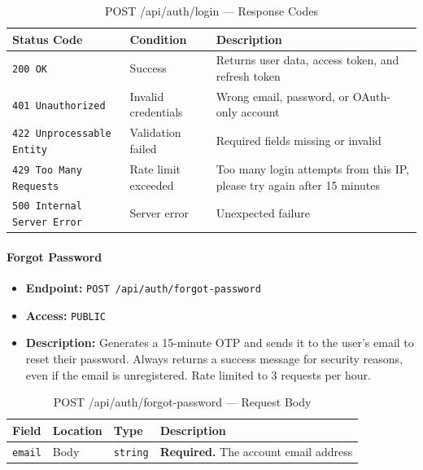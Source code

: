 \begin{table}[H]
\centering
\renewcommand{\arraystretch}{1.3}
\begin{tabularx}{\textwidth}{|l|l|X|}
\hline
\textbf{Status Code} & \textbf{Condition} & \textbf{Description} \\
\hline
\texttt{200 OK}           & Success            & Returns user data, access token, and refresh token \\
\hline
\texttt{401 Unauthorized} & Invalid credentials & Wrong email, password, or OAuth-only account \\
\hline
\texttt{422 Unprocessable Entity} & Validation failed & Required fields missing or invalid \\
\hline
\texttt{429 Too Many Requests} & Rate limit exceeded & Too many login attempts from this IP, please try again after 15 minutes \\
\hline
\texttt{500 Internal Server Error} & Server error & Unexpected failure \\
\hline
\end{tabularx}
\caption{POST /api/auth/login — Response Codes}
\label{tab:login-responses}
\end{table}
\FloatBarrier

\paragraph{Forgot Password}
\label{subsubsec:forgot-password}

\begin{itemize}
  \item \textbf{Endpoint:} \texttt{POST /api/auth/forgot-password}
  \item \textbf{Access:} \texttt{PUBLIC}
  \item \textbf{Description:} Generates a 15-minute OTP and sends it to the user's email to reset their password. Always returns a success message for security reasons, even if the email is unregistered. Rate limited to 3 requests per hour.
\end{itemize}

\begin{table}[H]
\centering
\renewcommand{\arraystretch}{1.3}
\begin{tabularx}{\textwidth}{|l|l|l|X|}
\hline
\textbf{Field} & \textbf{Location} & \textbf{Type} & \textbf{Description} \\
\hline
\texttt{email} & Body & \texttt{string} & \textbf{Required.} The account email address \\
\hline
\end{tabularx}
\caption{POST /api/auth/forgot-password — Request Body}
\label{tab:forgot-password-body}
\end{table}

